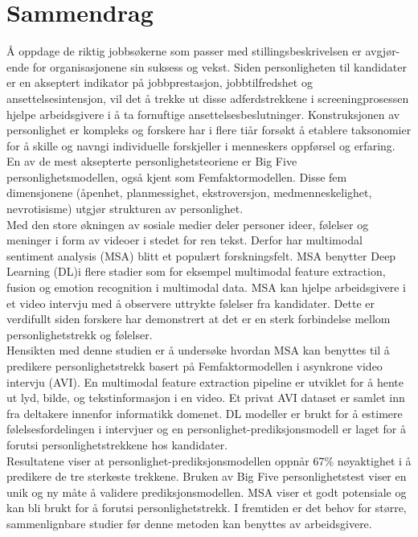 \chapter*{Sammendrag}
Å oppdage de riktig jobbsøkerne som passer med stillingsbeskrivelsen er avgjør-ende for organisasjonene sin suksess og vekst. Siden personligheten til kandidater er en akseptert indikator på jobbprestasjon, jobbtilfredshet og ansettelsesintensjon, vil det å trekke ut disse adferdstrekkene i screeningprosessen hjelpe arbeidsgivere i å ta fornuftige ansettelsesbeslutninger. Konstruksjonen av personlighet er kompleks og forskere har i flere tiår forsøkt å etablere taksonomier for å skille og navngi individuelle forskjeller i menneskers oppførsel og erfaring. En av de mest aksepterte personlighetsteoriene er Big Five personlighetsmodellen, også kjent som Femfaktormodellen. Disse fem dimensjonene (åpenhet, planmessighet, ekstroversjon, medmenneskelighet, nevrotisisme) utgjør strukturen av personlighet. \\

Med den store økningen av sosiale medier deler personer ideer, følelser og meninger i form av videoer i stedet for ren tekst. Derfor har multimodal sentiment analysis (MSA) blitt et populært forskningsfelt. MSA benytter Deep Learning (DL)i flere stadier som for eksempel multimodal feature extraction, fusion og emotion recognition i multimodal data. MSA kan hjelpe arbeidsgivere i et video intervju med å observere uttrykte følelser fra kandidater. Dette er verdifullt siden forskere har demonstrert at det er en sterk forbindelse mellom personlighetstrekk og følelser. \\

Hensikten med denne studien er å undersøke hvordan MSA kan benyttes til å predikere personlighetstrekk basert på Femfaktormodellen i asynkrone video intervju (AVI). En multimodal feature extraction pipeline er utviklet for å hente ut lyd, bilde, og tekstinformasjon i en video. Et privat AVI dataset er samlet inn fra deltakere innenfor informatikk domenet. DL modeller er brukt for å estimere følelsesfordelingen i intervjuer og en personlighet-prediksjonsmodell er laget for å forutsi personlighetstrekkene hos kandidater. \\

Resultatene viser at personlighet-prediksjonsmodellen oppnår 67\% nøyaktighet i å predikere de tre sterkeste trekkene. Bruken av Big Five personlighetstest viser en unik og ny måte å validere prediksjonsmodellen. MSA viser et godt potensiale og kan bli brukt for å forutsi personlighetstrekk. I fremtiden er det behov for større, sammenlignbare studier før denne metoden kan benyttes av arbeidsgivere. 



